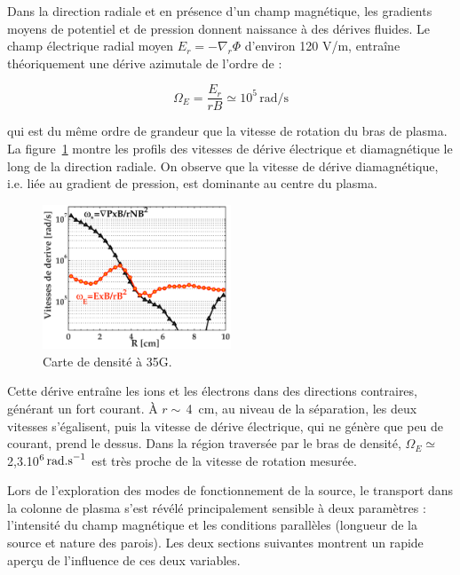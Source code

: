 \begin{refsection}
Dans la direction radiale et en présence d'un champ magnétique, les gradients
moyens de potentiel et de pression donnent naissance à des dérives
fluides. 
Le champ électrique radial moyen $E_r=-\nabla_r\Phi$ d'environ 120 V/m,
entraîne théoriquement une dérive azimutale de l'ordre de :

\begin{equation}
\Omega_E=\frac{E_r}{rB}\simeq10^5\,\text{rad/s} 
\end{equation}

qui est du même ordre de grandeur que la vitesse de rotation du bras de plasma.
La figure~\ref{4-CybeleVitessesDerive} montre les profils des vitesses
de dérive électrique et diamagnétique le long de la direction radiale. On
observe que la vitesse de dérive diamagnétique, i.e. liée au gradient de
pression, est dominante au centre du plasma. 

\begin{figure}[!htbp]
\centering
\includegraphics[width=0.5\textwidth]{figures/4-CybeleProfileVitessesDerive.eps}
{\caption{Carte de densité à 35G.}
\label{4-CybeleVitessesDerive}}
\end{figure}

Cette dérive entraîne les ions et les électrons dans des directions
contraires, générant un fort courant. À $r\sim\,$4~cm, au niveau de la
séparation, les deux vitesses s'égalisent, puis la vitesse de dérive électrique, qui ne
génère que peu de courant, prend le dessus. Dans la région traversée par le bras
de densité, $\Omega_E\simeq$ 2,3.10$^{{6}}\,\text{rad.s}^{{-1}}$
est très proche de la vitesse de rotation mesurée.

Lors de l'exploration des modes de fonctionnement de la source, le transport
dans la colonne de plasma s'est révélé principalement sensible à deux
paramètres : l'intensité du champ magnétique et les conditions parallèles 
(longueur de la source et nature des parois). Les deux sections suivantes
montrent un rapide aperçu de l'influence de ces deux variables.


\end{refsection}
